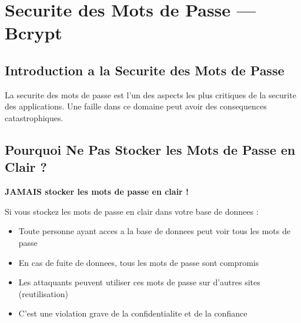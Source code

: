 \documentclass[a4paper,12pt]{book}
\begin{document}
\chapter{Securite des Mots de Passe — Bcrypt}

\section{Introduction a la Securite des Mots de Passe}

La securite des mots de passe est l'un des aspects les plus critiques de la securite des applications. Une faille dans ce domaine peut avoir des consequences catastrophiques.


\section{Pourquoi Ne Pas Stocker les Mots de Passe en Clair ?}

\begin{errorbox}
    \textbf{JAMAIS stocker les mots de passe en clair !}

    Si vous stockez les mots de passe en clair dans votre base de donnees :
    \begin{itemize}
        \item Toute personne ayant acces a la base de donnees peut voir tous les mots de passe
        \item En cas de fuite de donnees, tous les mots de passe sont compromis
        \item Les attaquants peuvent utiliser ces mots de passe sur d'autres sites (reutilisation)
        \item C'est une violation grave de la confidentialite et de la confiance
    \end{itemize}
\end{errorbox}
\end{document}
